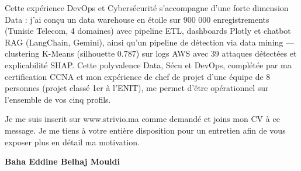 \documentclass[a4paper,11pt]{article}
\begin{document}
Cette expérience DevOps et Cybersécurité s'accompagne d'une forte dimension Data : j'ai conçu un data warehouse en étoile sur 900 000 enregistrements (Tunisie Telecom, 4 domaines) avec pipeline ETL, dashboards Plotly et chatbot RAG (LangChain, Gemini), ainsi qu'un pipeline de détection via data mining — clustering K-Means (silhouette 0.787) sur logs AWS avec 39 attaques détectées et explicabilité SHAP. Cette polyvalence Data, Sécu et DevOps, complétée par ma certification CCNA et mon expérience de chef de projet d'une équipe de 8 personnes (projet classé 1er à l'ENIT), me permet d'être opérationnel sur l'ensemble de vos cinq profils.

Je me suis inscrit sur www.strivio.ma comme demandé et joins mon CV à ce message. Je me tiens à votre entière disposition pour un entretien afin de vous exposer plus en détail ma motivation.

\vspace{0.8cm}

\begin{flushright}
{\bfseries Baha Eddine Belhaj Mouldi}
\end{flushright}
\end{document}
